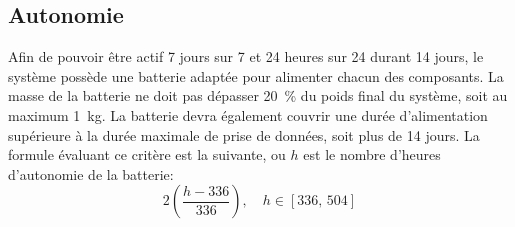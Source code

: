 

\subsection{Autonomie}
\label{s:cdc_aut_autnmi}

Afin de pouvoir être actif 7 jours sur 7 et 24 heures sur 24 durant 14 jours, le système possède une batterie adaptée pour alimenter chacun des composants.
La masse de la batterie ne doit pas dépasser 20~\% du poids final du système, soit au maximum 1~kg.
La batterie devra également couvrir une durée d’alimentation supérieure à la durée maximale de prise de données, soit plus de 14 jours.
\wl
La formule évaluant ce critère est la suivante, ou $h$ est le nombre d’heures d’autonomie de la batterie:
\begin{equation} \label{eq:cdc_aut_autnmi}
	2\left(\frac{h-336}{336}\right),\quad h \in [336,\,504]
\end{equation}